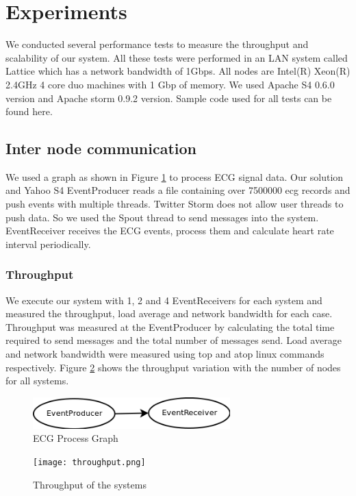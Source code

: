 \section{Experiments}

We conducted several performance tests to measure the throughput and scalability of our system. All these tests were performed in an LAN system called Lattice which has a network bandwidth of 1Gbps. All nodes are Intel(R) Xeon(R) 2.4GHz 4 core duo machines with 1 Gbp of memory. We used Apache S4 0.6.0 version and Apache storm 0.9.2 version. Sample code used for all tests can be found here\cite{solutionCode}.


\subsection{Inter node communication}
We used a graph as shown in Figure \ref{ecgGraph} to process ECG signal data. Our solution and Yahoo S4\cite{neumeyer2010s4} EventProducer reads a file containing over 7500000 ecg records and push events with multiple threads. Twitter Storm\cite{twitterStorm} does not allow user threads to push data. So we used the Spout thread to send messages into the system. EventReceiver  receives the ECG events, process them and calculate heart rate interval periodically.  
\subsubsection{Throughput}
We execute our system with 1, 2 and 4  EventReceivers for each system and measured the throughput, load average and network bandwidth  for each case. Throughput was measured at the EventProducer by calculating the total time required to send messages and the total number of messages send. Load average and network bandwidth were measured using top and atop linux commands respectively. Figure \ref{throuput} shows the throughput variation with the number of nodes for all systems. 

\begin{figure}[!t]
        \centering
        \includegraphics[width=3.0in]{ecgGraph.png}
        \caption{ECG Process Graph}
        \label{ecgGraph}
\end{figure}
\begin{figure}[!t]
        \centering
        \texttt{[image: throughput.png]}
        \caption{Throughput of the systems}
        \label{throuput}
\end{figure}


